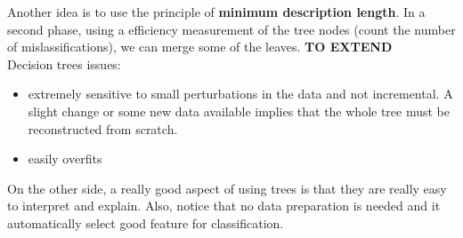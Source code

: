 Another idea is to use the principle of \textbf{minimum description length}. In a second phase, using a efficiency measurement of the tree nodes (count the number of mislassifications), we can merge some of the leaves. \textbf{TO EXTEND}\\
Decision trees issues:
\begin{itemize}
	\item extremely sensitive to small perturbations in the data and not incremental. A slight change or some new data available implies that the whole tree must be reconstructed from scratch.
	\item easily overfits
\end{itemize}

On the other side, a really good aspect of using trees is that they are really easy to interpret and explain. Also, notice that no data preparation is needed and it automatically select good feature for classification.